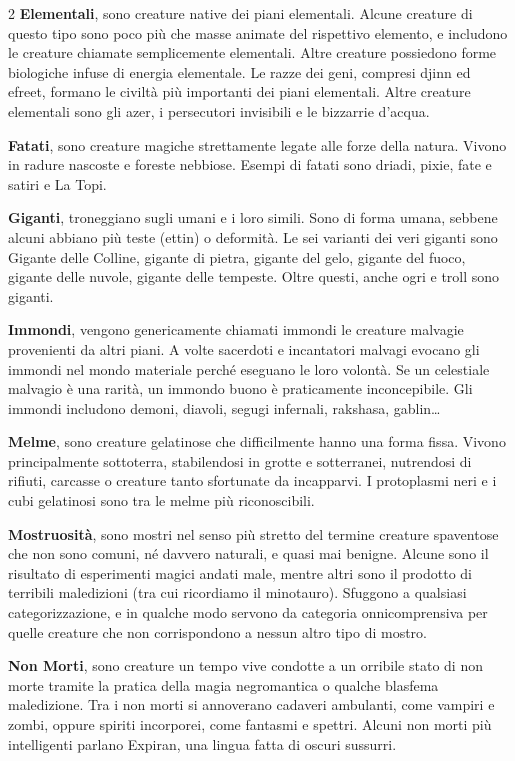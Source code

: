 \begin{multicols}{2}
\smallskip\textbf{Elementali}, sono creature native dei piani elementali. Alcune creature di questo tipo sono poco più che masse animate del rispettivo elemento, e includono le creature chiamate semplicemente elementali. Altre creature possiedono forme biologiche infuse di energia elementale. Le razze dei geni, compresi djinn ed efreet, formano le civiltà più importanti dei piani elementali. Altre creature elementali sono gli azer, i persecutori invisibili e le bizzarrie d'acqua.

\smallskip\textbf{Fatati}, sono creature magiche strettamente legate alle forze della natura. Vivono in radure nascoste e foreste nebbiose. Esempi di fatati sono driadi, pixie, fate e satiri e La Topi.

\smallskip\textbf{Giganti}, troneggiano sugli umani e i loro simili. Sono di forma umana, sebbene alcuni abbiano più teste (ettin) o deformità. Le sei varianti dei veri giganti sono Gigante delle Colline, gigante di pietra, gigante del gelo, gigante del fuoco, gigante delle nuvole, gigante delle tempeste. Oltre questi, anche ogri e troll sono giganti.

\smallskip\textbf{Immondi}, vengono genericamente chiamati immondi le creature malvagie provenienti da altri piani. A volte sacerdoti e incantatori malvagi evocano gli immondi nel mondo materiale perché eseguano le loro volontà. Se un celestiale malvagio è una rarità, un immondo buono è praticamente inconcepibile. Gli immondi includono demoni, diavoli, segugi infernali, rakshasa, gablin…

\smallskip\textbf{Melme}, sono creature gelatinose che difficilmente hanno una forma fissa. Vivono principalmente sottoterra, stabilendosi in grotte e sotterranei, nutrendosi di rifiuti, carcasse o creature tanto sfortunate da incapparvi. I protoplasmi neri e i cubi gelatinosi sono tra le melme più riconoscibili.

\smallskip\textbf{Mostruosità}, sono mostri nel senso più stretto del termine creature spaventose che non sono comuni, né davvero naturali, e quasi mai benigne. Alcune sono il risultato di esperimenti magici andati male, mentre altri sono il prodotto di terribili maledizioni (tra cui ricordiamo il minotauro). Sfuggono a qualsiasi categorizzazione, e in qualche modo servono da categoria onnicomprensiva per quelle creature che non corrispondono a nessun altro tipo di mostro.

\smallskip\textbf{Non Morti}, sono creature un tempo vive condotte a un orribile stato di non morte tramite la pratica della magia negromantica o qualche blasfema maledizione. Tra i non morti si annoverano cadaveri ambulanti, come vampiri e zombi, oppure spiriti incorporei, come fantasmi e spettri. Alcuni non morti più intelligenti parlano Expiran, una lingua fatta di oscuri sussurri.


\end{multicols}
